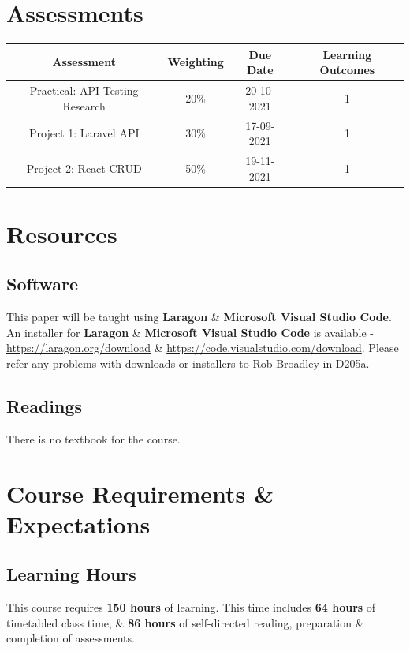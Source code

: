 \documentclass{article}
\begin{document}
\section*{Assessments}
\renewcommand{\arraystretch}{1.5}
\begin{tabular}{|c|c|c|c|}
	\hline
	\textbf{Assessment}                                & \textbf{Weighting} & \textbf{Due Date} & \textbf{Learning Outcomes} \\ \hline 
	\small Practical: API Testing Research                      & \small 20\%        & \small 20-10-2021 & \small 1                   \\ \hline
	\small Project 1: Laravel API                       & \small 30\%        & \small 17-09-2021 & \small 1                   \\ \hline
	\small Project 2: React CRUD                       & \small 50\%        & \small 19-11-2021 & \small 1                   \\ \hline 
\end{tabular} 

\section*{Resources}

\subsection*{Software}
This paper will be taught using \textbf{Laragon} \& \textbf{Microsoft Visual Studio Code}. An installer for \textbf{Laragon} \& \textbf{Microsoft Visual Studio Code} is available - \href{https://laragon.org/download/index.html}{https://laragon.org/download} \& \href{https://code.visualstudio.com/download}{https://code.visualstudio.com/download}. Please refer any problems with downloads or installers to Rob Broadley in D205a.

\subsection*{Readings}
There is no textbook for the course.

\section*{Course Requirements \& Expectations}

\subsection*{Learning Hours}
This course requires \textbf{150 hours} of learning. This time includes \textbf{64 hours} of timetabled class time, \& \textbf{86 hours} of self-directed reading, preparation \& completion of assessments.
\end{document}
